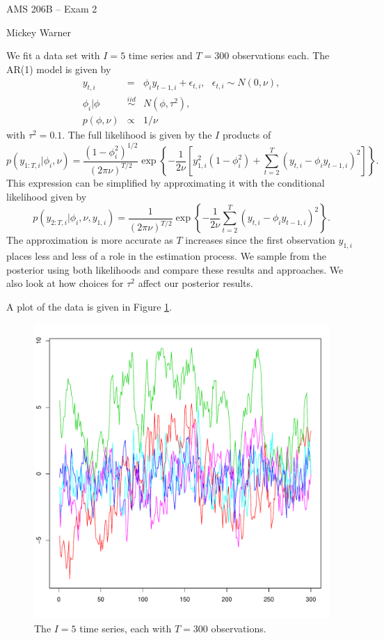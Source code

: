 \documentclass[12pt]{article}
\begin{document}
\begin{large}
\noindent AMS 206B -- Exam 2
\smallskip

\noindent Mickey Warner
\end{large}
\bigskip

\noindent We fit a data set with $I=5$ time series and $T=300$ observations each. The AR(1) model is given by
\begin{eqnarray*}
y_{t,i} &=& \phi_iy_{t-1,i}+\epsilon_{t,i},~~~\epsilon_{t,i}\sim N(0, \nu), \\
\phi_i|\phi &\overset{iid}\sim& N(\phi, \tau^2), \\
p(\phi,\nu) &\propto& 1/\nu
\end{eqnarray*}
\noindent with $\tau^2=0.1$. The full likelihood is given by the $I$ products of
\[ p(y_{1:T,i}|\phi_i,\nu) = \frac{(1-\phi_i^2)^{1/2}}{(2\pi\nu)^{T/2}}\exp\left\{-\frac{1}{2\nu}\left[y_{1,i}^2(1-\phi_i^2)+\sum_{t=2}^T(y_{t,i}-\phi_iy_{t-1,i})^2\right]\right\}. \]
\noindent This expression can be simplified by approximating it with the conditional likelihood given by
\[ p(y_{2:T,i}|\phi_i,\nu,y_{1,i}) = \frac{1}{(2\pi\nu)^{T/2}}\exp\left\{-\frac{1}{2\nu}\sum_{t=2}^T(y_{t,i}-\phi_iy_{t-1,i})^2\right\}. \]
\noindent The approximation is more accurate as $T$ increases since the first observation $y_{1,i}$ places less and less of a role in the estimation process. We sample from the posterior using both likelihoods and compare these results and approaches. We also look at how choices for $\tau^2$ affect our posterior results.
\bigskip

\noindent A plot of the data is given in Figure \ref{data}.
\begin{figure}[H]
\begin{center}
\includegraphics[scale=0.38]{figs/data.pdf}
\end{center}
\caption{The $I=5$ time series, each with $T=300$ observations.}
\label{data}
\end{figure}
\end{document}
